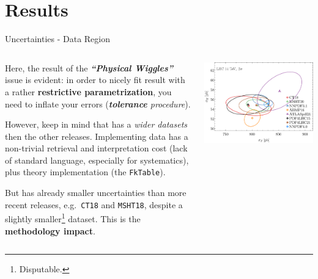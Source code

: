 \documentclass[9pt]{beamer}
\begin{document}
\section{Results}

\begin{frame}{Uncertainties - Data Region}
    \begin{columns}
        \begin{column}{0.5\textwidth}
            \vspace*{10pt}

            Here, the result of the \textbf{\textit{\enquote{Physical
            Wiggles}}} issue is evident: in order to nicely fit result with a
            rather \textbf{restrictive parametrization}, you need to inflate
            your errors (\textit{\alert{\textbf{tolerance}} procedure}).
            \vspace*{15pt}

            However, keep in mind that  has a \textit{wider
            datasets} then the other releases.\newline
            Implementing data has a non-trivial retrieval and interpretation
            cost (lack of standard language, especially for systematics), plus
            theory implementation (the \texttt{FkTable}).
            \vspace*{15pt}

            But  has already smaller uncertainties than more recent
            releases, e.g.\ \texttt{CT18} and \texttt{MSHT18}, despite a
            slightly smaller\footnote{Disputable.} dataset.\newline
            This is the \alert{\textbf{methodology impact}}.
            \vspace*{15pt}
        \end{column}
        \begin{column}{0.5\textwidth}
            \begin{tcolorbox}
                \includegraphics[width=\textwidth]{Corr_Z2H14TeV_2sigma}
            \end{tcolorbox}
        \end{column}
    \end{columns}
\end{frame}
\end{document}
